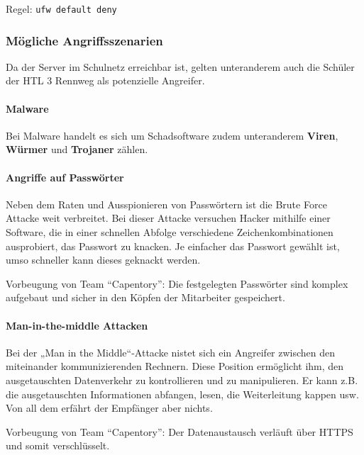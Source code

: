 Regel: \texttt{ufw\ default\ deny}

\hypertarget{muxf6gliche-angriffsszenarien}{%
\subsubsection{Mögliche
Angriffsszenarien}\label{muxf6gliche-angriffsszenarien}}

Da der Server im Schulnetz erreichbar ist, gelten unteranderem auch die
Schüler der HTL 3 Rennweg als potenzielle Angreifer.

\hypertarget{malware}{%
\paragraph{Malware}\label{malware}}

Bei Malware handelt es sich um Schadsoftware zudem unteranderem
\textbf{Viren}, \textbf{Würmer} und \textbf{Trojaner} zählen.

\hypertarget{angriffe-auf-passwuxf6rter}{%
\paragraph{Angriffe auf Passwörter}\label{angriffe-auf-passwuxf6rter}}

Neben dem Raten und Ausspionieren von Passwörtern ist die Brute Force
Attacke weit verbreitet. Bei dieser Attacke versuchen Hacker mithilfe
einer Software, die in einer schnellen Abfolge verschiedene
Zeichenkombinationen ausprobiert, das Passwort zu knacken. Je einfacher
das Passwort gewählt ist, umso schneller kann dieses geknackt werden.

Vorbeugung von Team ``Capentory'': Die festgelegten Passwörter sind
komplex aufgebaut und sicher in den Köpfen der Mitarbeiter gespeichert.

\hypertarget{man-in-the-middle-attacken}{%
\paragraph{Man-in-the-middle
Attacken}\label{man-in-the-middle-attacken}}

Bei der „Man in the Middle``-Attacke nistet sich ein Angreifer zwischen
den miteinander kommunizierenden Rechnern. Diese Position ermöglicht
ihm, den ausgetauschten Datenverkehr zu kontrollieren und zu
manipulieren. Er kann z.B. die ausgetauschten Informationen abfangen,
lesen, die Weiterleitung kappen usw. Von all dem erfährt der Empfänger
aber nichts.

Vorbeugung von Team ``Capentory'': Der Datenaustausch verläuft über
HTTPS und somit verschlüsselt.

